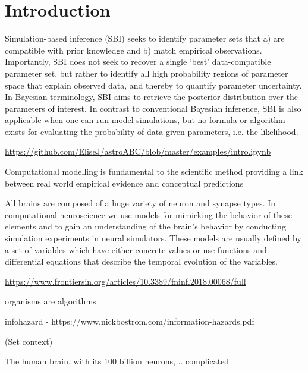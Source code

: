 \chapter{Introduction}


Simulation-based inference (SBI) seeks to identify parameter sets that a)
are compatible with prior knowledge and b) match empirical observations. Importantly,
SBI does not seek to recover a single ‘best’ data-compatible parameter set, but rather
to identify all high probability regions of parameter space that explain observed data,
and thereby to quantify parameter uncertainty. In Bayesian terminology, SBI aims to retrieve the posterior distribution over the parameters of interest. In contrast to conventional
Bayesian inference, SBI is also applicable when one can run model simulations, but no
formula or algorithm exists for evaluating the probability of data given parameters, i.e.
the likelihood.

\url{https://github.com/EliseJ/astroABC/blob/master/examples/intro.ipynb}

Computational modelling is fundamental to the scientific method providing a link between real world empirical evidence and conceptual predictions

All brains are composed of a huge variety of neuron and synapse types. In computational neuroscience we use models for mimicking the behavior of these elements and to gain an understanding of the brain's behavior by conducting simulation experiments in neural simulators. These models are usually defined by a set of variables which have either concrete values or use functions and differential equations that describe the temporal evolution of the variables.

\url{https://www.frontiersin.org/articles/10.3389/fninf.2018.00068/full}

organisms are algorithms

infohazard - https://www.nickbostrom.com/information-hazards.pdf

(Set context)

The human brain, with its 100 billion neurons, .. complicated 

